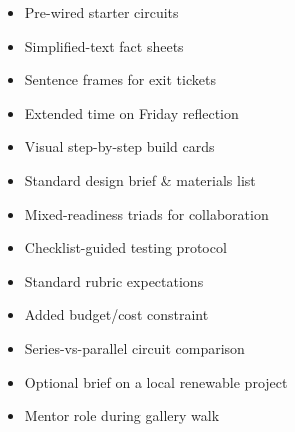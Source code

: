 \documentclass[11pt,a4paper,parskip=half]{scrartcl}
\begin{document}
\noindent
\begin{minipage}[t]{0.32\textwidth}
\begin{tcolorbox}[colback=stembg,colframe=stemteal,arc=1mm,boxrule=0.4pt,title=Support / Intervention,coltitle=white,colbacktitle=stemslate,fonttitle=\small\bfseries,left=5pt,right=5pt,top=4pt,bottom=4pt]
\small
\begin{itemize}[leftmargin=12pt,itemsep=2pt,topsep=2pt]
  \item Pre-wired starter circuits
  \item Simplified-text fact sheets
  \item Sentence frames for exit tickets
  \item Extended time on Friday reflection
  \item Visual step-by-step build cards
\end{itemize}
\end{tcolorbox}
\end{minipage}%
\hfill
\begin{minipage}[t]{0.32\textwidth}
\begin{tcolorbox}[colback=stembg,colframe=stemteal,arc=1mm,boxrule=0.4pt,title=On-Level,coltitle=white,colbacktitle=stemteal,fonttitle=\small\bfseries,left=5pt,right=5pt,top=4pt,bottom=4pt]
\small
\begin{itemize}[leftmargin=12pt,itemsep=2pt,topsep=2pt]
  \item Standard design brief \& materials list
  \item Mixed-readiness triads for collaboration
  \item Checklist-guided testing protocol
  \item Standard rubric expectations
\end{itemize}
\end{tcolorbox}
\end{minipage}%
\hfill
\begin{minipage}[t]{0.32\textwidth}
\begin{tcolorbox}[colback=stembg,colframe=stemamber,arc=1mm,boxrule=0.4pt,title=Enrichment,coltitle=white,colbacktitle=stemamber,fonttitle=\small\bfseries,left=5pt,right=5pt,top=4pt,bottom=4pt]
\small
\begin{itemize}[leftmargin=12pt,itemsep=2pt,topsep=2pt]
  \item Added budget/cost constraint
  \item Series-vs-parallel circuit comparison
  \item Optional brief on a local renewable project
  \item Mentor role during gallery walk
\end{itemize}
\end{tcolorbox}
\end{minipage}
\par
\end{document}
